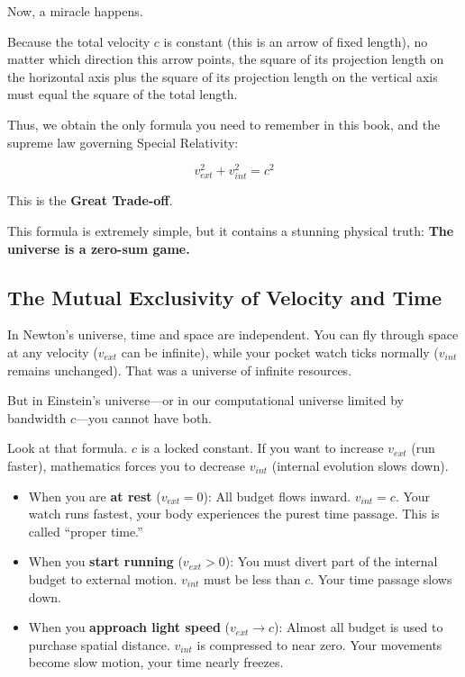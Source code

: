 Now, a miracle happens.

Because the total velocity $c$ is constant (this is an arrow of fixed length), no matter which direction this arrow points, the square of its projection length on the horizontal axis plus the square of its projection length on the vertical axis must equal the square of the total length.

Thus, we obtain the only formula you need to remember in this book, and the supreme law governing Special Relativity:

$$v_{ext}^2 + v_{int}^2 = c^2$$

This is the \textbf{Great Trade-off}.

This formula is extremely simple, but it contains a stunning physical truth: \textbf{The universe is a zero-sum game.}

\subsection{The Mutual Exclusivity of Velocity and Time}

In Newton's universe, time and space are independent. You can fly through space at any velocity ($v_{ext}$ can be infinite), while your pocket watch ticks normally ($v_{int}$ remains unchanged). That was a universe of infinite resources.

But in Einstein's universe---or in our computational universe limited by bandwidth $c$---you cannot have both.

Look at that formula. $c$ is a locked constant. If you want to increase $v_{ext}$ (run faster), mathematics forces you to decrease $v_{int}$ (internal evolution slows down).

\begin{itemize}
\item When you are \textbf{at rest} ($v_{ext} = 0$): All budget flows inward. $v_{int} = c$. Your watch runs fastest, your body experiences the purest time passage. This is called ``proper time.''

\item When you \textbf{start running} ($v_{ext} > 0$): You must divert part of the internal budget to external motion. $v_{int}$ must be less than $c$. Your time passage slows down.

\item When you \textbf{approach light speed} ($v_{ext} \to c$): Almost all budget is used to purchase spatial distance. $v_{int}$ is compressed to near zero. Your movements become slow motion, your time nearly freezes.
\end{itemize}

